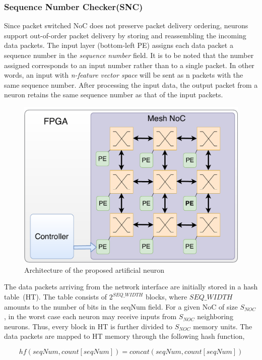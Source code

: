 \subsubsection{\bf Sequence Number Checker(SNC)}
 
Since packet switched NoC does not preserve packet delivery ordering, neurons support out-of-order packet delivery by storing and reassembling the incoming data packets. 
The input layer (bottom-left PE) assigns each data packet a sequence number in the \emph{sequence number} field. 
It is to be noted that the number assigned corresponds to an input number rather than to a single packet.
In other words, an input with \emph{n-feature vector space} will be sent as n packets with the same sequence number. 
After processing the input data, the output packet from a neuron retains the same sequence number as that of the input packets. 

\begin{figure}
    \centering
    \includegraphics[width =0.8\columnwidth]{Figures/NeuroNoC.pdf}
    \caption{Architecture of the proposed artificial neuron}
    \label{fig:neuron}
\end{figure}

The data packets arriving from the network interface are initially stored in a hash table~(HT). 
The table consists of $2^{SEQ\_WIDTH}$ blocks, where $SEQ\_WIDTH$ amounts to the number of bits in the seqNum field. 
For a given NoC of size $S_{NOC}$, in the worst case each neuron may receive inputs from $S_{NOC}$ neighboring neurons. 
Thus, every block in HT is further divided to $S_{NOC}$ memory units. 
The data packets are mapped to HT memory through the following hash function,

\begin{equation}
hf(seqNum,count[seqNum]) = concat(seqNum,count[seqNum])
\label{equation:hf}
\end{equation}

